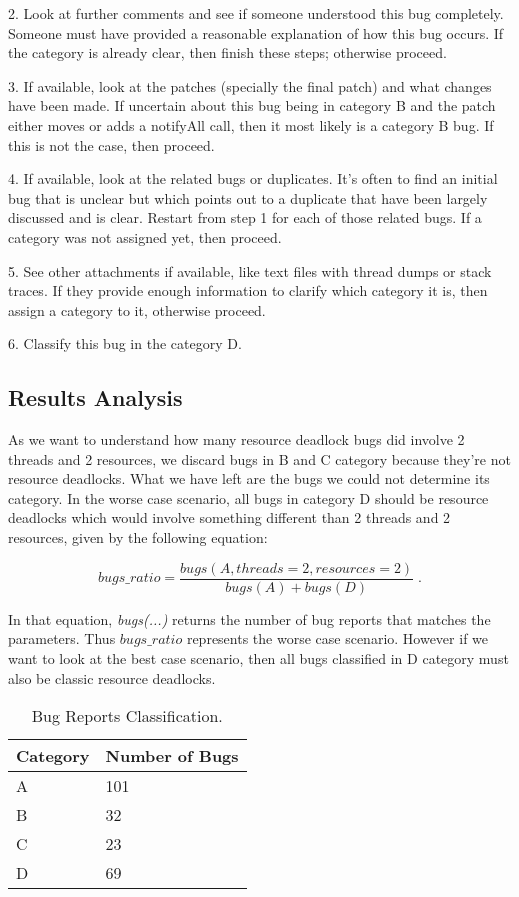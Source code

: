 2. Look at further comments and see if someone understood this bug completely. Someone must have provided a reasonable explanation of how this bug occurs. If the category is already clear, then finish these steps; otherwise proceed.

3. If available, look at the patches (specially the final patch) and what changes have been made. If uncertain about this bug being in category B and the patch either moves or adds a notifyAll call, then it most likely is a category B bug. If this is not the case, then proceed.

4. If available, look at the related bugs or duplicates. It's often to find an initial bug that is unclear but which points out to a duplicate that have been largely discussed and is clear. Restart from step 1 for each of those related bugs. If a category was not assigned yet, then proceed.

5. See other attachments if available, like text files with thread dumps or stack traces. If they provide enough information to clarify which category it is, then assign a category to it, otherwise proceed.

6. Classify this bug in the category D.

\subsection{Results Analysis}

As we want to understand how many resource deadlock bugs did involve 2 threads and 2 resources, we discard bugs in B and C category because they're not resource deadlocks. What we have left are the bugs we could not determine its category. In the worse case scenario, all bugs in category D should be resource deadlocks which would involve something different than 2 threads and 2 resources, given by the following equation:

\begin{equation}
bugs\_ratio = \frac{ bugs(A, threads=2, resources=2) }{ bugs(A) + bugs(D) } \; .
\end{equation}

In that equation, \emph{bugs(...)} returns the number of bug reports that matches the parameters. Thus $bugs\_ratio$ represents the worse case scenario. However if we want to look at the best case scenario, then all bugs classified in D category must also be classic resource deadlocks.

\begin{table}
\begin{center}
\caption{Bug Reports Classification.}
\begin{tabular}{|l|l|}
\hline
Category & Number of Bugs \\
\hline
A & 101 \\   
B & 32 \\
C & 23 \\
D & 69 \\
\hline
\end{tabular}
\end{center}
\end{table}

